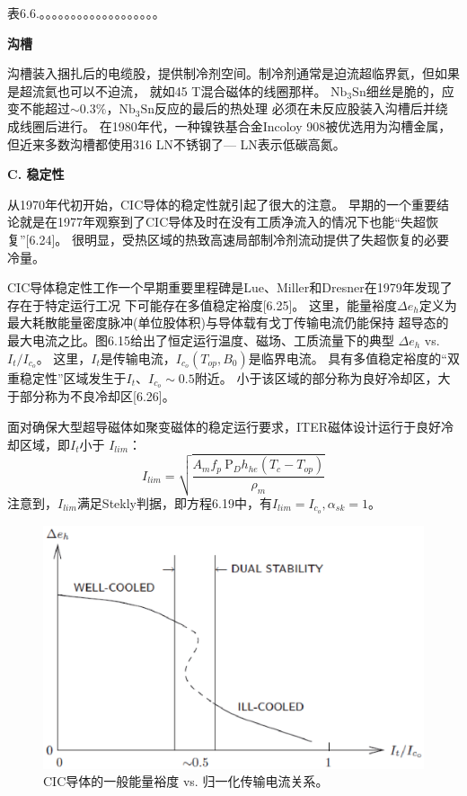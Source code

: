表6.6.。。。。。。。。。。。。。。。。。。。

\textbf{沟槽}

沟槽装入捆扎后的电缆股，提供制冷剂空间。制冷剂通常是迫流超临界氦，但如果是超流氦也可以不迫流，
就如45 T混合磁体的线圈那样。
$\mathrm{Nb_3Sn}$细丝是脆的，应变不能超过$\sim 0.3\%$，$\mathrm{Nb_3Sn}$反应的最后的热处理
必须在未反应股装入沟槽后并绕成线圈后进行。
在1980年代，一种镍铁基合金Incoloy 908被优选用为沟槽金属，但近来多数沟槽都使用316 LN不锈钢了---
LN表示低碳高氮。

\textbf{C. 稳定性}

从1970年代初开始，CIC导体的稳定性就引起了很大的注意。
早期的一个重要结论就是在1977年观察到了CIC导体及时在没有工质净流入的情况下也能“失超恢复”[6.24]。
很明显，受热区域的热致高速局部制冷剂流动提供了失超恢复的必要冷量。

CIC导体稳定性工作一个早期重要里程碑是Lue、Miller和Dresner在1979年发现了存在于特定运行工况
下可能存在多值稳定裕度[6.25]。
这里，能量裕度$\Delta e_h$定义为最大耗散能量密度脉冲(单位股体积)与导体载有戈丁传输电流仍能保持
超导态的最大电流之比。图6.15给出了恒定运行温度、磁场、工质流量下的典型
$\Delta e_h$ vs. $I_t/I_{c_o}$。
这里，$I_t$是传输电流，$I_{c_o}(T_{op},B_0)$是临界电流。
具有多值稳定裕度的“双重稳定性”区域发生于$I_t、I_{c_o}\sim 0.5$附近。
小于该区域的部分称为良好冷却区，大于部分称为不良冷却区[6.26]。

面对确保大型超导磁体如聚变磁体的稳定运行要求，ITER磁体设计运行于良好冷却区域，即$I_t$小于
$I_{lim}$：
\begin{equation}%
I_{lim}=\sqrt{\frac{A_mf_p\ \mathrm{P}_Dh_{he}(T_c-T_{op})}{\rho_m}}
\end{equation}
注意到，$I_{lim}$满足Stekly判据，即方程6.19中，有$I_{lim}=I_{c_o},\alpha_{sk}=1$。
\begin{figure}[htbp]
	\centering
	\includegraphics[scale=0.7]{chpt6/figs/fig6.15.eps}
	\caption{CIC导体的一般能量裕度 vs. 归一化传输电流关系。}
\end{figure}

